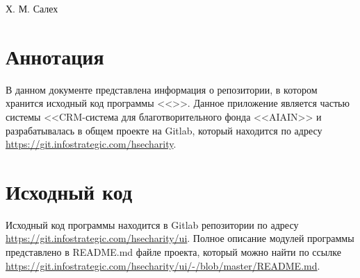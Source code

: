 \documentclass[a4paper,12pt]{article}
\begin{document}
	
	
	
	{Х. М. Салех}
	
	\firstPage
	\newpage
	\secondPage
	\newpage
	\thirdPageWithoutTOC
	\section*{Аннотация}
	
	В данном документе представлена информация о репозитории, в котором хранится исходный код программы <<>>. Данное приложение является частью системы <<CRM-система для благотворительного фонда <<AIAIN>> и разрабатывалась в общем проекте на Gitlab, который находится по адресу \url{https://git.infostrategic.com/hsecharity}.
	
	\newpage
	
	\section*{Исходный код}
	
	Исходный код программы находится в Gitlab репозитории по адресу \url{https://git.infostrategic.com/hsecharity/ui}. Полное описание модулей программы представлено в README.md файле проекта, который можно найти по ссылке \url{https://git.infostrategic.com/hsecharity/ui/-/blob/master/README.md}.

	\newpage
	\listRegistration
\end{document}
